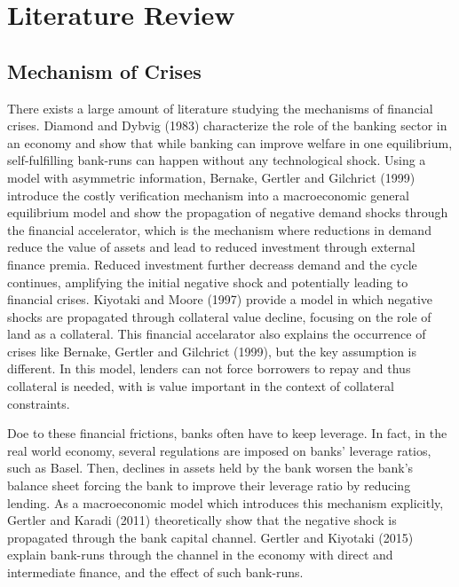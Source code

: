 \documentclass[a4paper,12pt]{article}
\begin{document}
\section{Literature Review}
\subsection{Mechanism of Crises}
There exists a large amount of literature studying the mechanisms of financial crises. Diamond and Dybvig (1983) characterize the role of the banking sector in an economy and show that while banking can improve welfare in one equilibrium, self-fulfilling bank-runs can happen without any technological shock. Using a model with asymmetric information, Bernake, Gertler and Gilchrict (1999) introduce the costly verification mechanism into a macroeconomic general equilibrium model and show the propagation of negative demand shocks through the financial accelerator, which is the mechanism where reductions in demand reduce the value of assets and lead to reduced investment through external finance premia. Reduced investment further decreass demand and the cycle continues, amplifying the initial negative shock and potentially leading to financial crises. Kiyotaki and Moore (1997) provide a model in which negative shocks are propagated through collateral value decline, focusing on the role of land as a collateral. This financial accelarator also explains the occurrence of crises like Bernake, Gertler and Gilchrict (1999), but the key assumption is different. In this model, lenders can not force borrowers to repay and thus collateral is needed, with is value important in the context of collateral constraints. \par
Doe to these financial frictions, banks often have to keep leverage. In fact, in the real world economy, several regulations are imposed on banks' leverage ratios, such as Basel. Then, declines in assets held by the bank worsen the bank's balance sheet forcing the bank to improve their leverage ratio by reducing lending. As a macroeconomic model which introduces this mechanism explicitly, Gertler and Karadi (2011) theoretically show that the negative shock is propagated through the bank capital channel. Gertler and Kiyotaki (2015) explain bank-runs through the channel in the economy with direct and intermediate finance, and the effect of such bank-runs. \par
\end{document}
